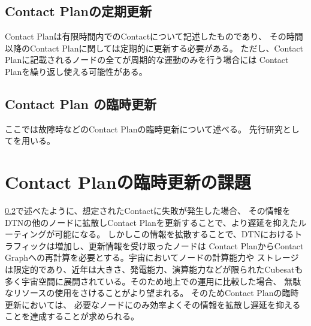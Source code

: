 \subsection{Contact Planの定期更新}
\label{sec:ContactPlanの定期更新}
Contact Planは有限時間内でのContactについて記述したものであり、
その時間以降のContact Planに関しては定期的に更新する必要がある。
ただし、Contact Planに記載されるノードの全てが周期的な運動のみを行う場合には
Contact Planを繰り返し使える可能性がある。

\subsection{Contact Plan の臨時更新}
\label{sec:ContactPlanの臨時更新}
ここでは故障時などのContact Planの臨時更新について述べる。
先行研究として\cite{Bezirgiannidis2013}を用いる。

\section{Contact Planの臨時更新の課題}
\label{sec:ContactPlanの臨時更新の課題}
\ref{sec:ContactPlanの臨時更新}で述べたように、想定されたContactに失敗が発生した場合、
その情報をDTNの他のノードに拡散しContact Planを更新することで、より遅延を抑えたルーティングが可能になる。
しかしこの情報を拡散することで、DTNにおけるトラフィックは増加し、更新情報を受け取ったノードは
Contact PlanからContact Graphへの再計算を必要とする。宇宙においてノードの計算能力や
ストレージは限定的であり、近年は大きさ、発電能力、演算能力などが限られたCubesatも
多く宇宙空間に展開されている。そのため地上での運用に比較した場合、
無駄なリソースの使用をさけることがより望まれる。
そのためContact Planの臨時更新においては、
必要なノードにのみ効率よくその情報を拡散し遅延を抑えることを達成することが求められる。